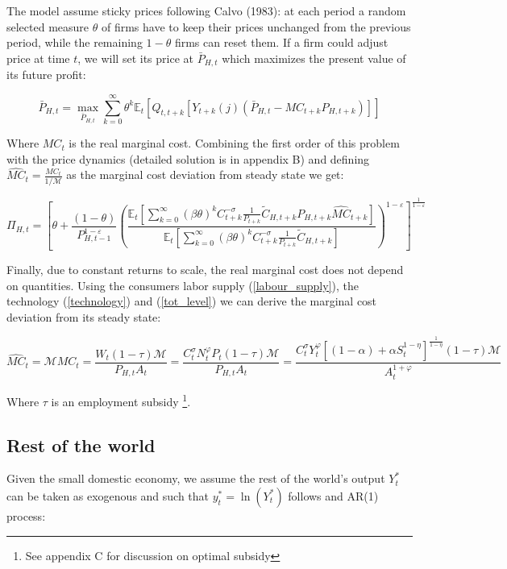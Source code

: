 \documentclass{article}
\newcommand{\Et}{\mathbb{E}_t}
\begin{document}
The model assume sticky prices following Calvo (1983): at each period a random selected measure $\theta$ of firms have to keep their prices unchanged from the previous period, while the remaining $1-\theta$ firms can reset them. If a firm could adjust price at time $t$, we will set its price at $\bar P_{H,t}$ which maximizes the present value of its future profit:

\begin{equation}
    \bar P_{H,t} = \max_{\bar P_{H,t}} \sum^\infty_{k=0} \theta^k \Et \left[ Q_{t, t+k}[Y_{t+k}(j) (\bar P_{H,t} - MC_{t+k} P_{H,t+k})] \right]
\end{equation}

Where $MC_t$ is the real marginal cost. Combining the first order of this problem with the price dynamics (detailed solution is in appendix B) and defining $\widehat{MC}_t = \frac{MC_t}{1/ \mathcal M}$ as the marginal cost deviation from steady state we get:

\begin{equation}
    \label{nkpc}
    \Pi_{H,t} = \left[ \theta + \frac{(1-\theta)}{P_{H,t-1}^{1-\varepsilon}} \left(\frac{\Et\left[ \sum^\infty_{k=0} (\beta\theta)^k C_{t+k}^{-\sigma} \frac{1}{P_{t+k}}\tilde C_{H,t+k} P_{H,t+k} \widehat{MC}_{t+k}\right] }{\Et\left[ \sum^\infty_{k=0} (\beta\theta)^k C_{t+k}^{-\sigma} \frac{1}{P_{t+k}} \tilde C_{H,t+k}  \right]} \right)^{1-\varepsilon}\right]^\frac{1}{1-\varepsilon}
\end{equation}

Finally, due to constant returns to scale, the real marginal cost does not depend on quantities. Using the consumers labor supply (\ref{labour_supply}), the technology (\ref{technology}) and (\ref{tot_level}) we can derive the marginal cost deviation from its steady state:

\begin{equation}
    \label{marginal_cost}
    \widehat{MC}_t = \mathcal M MC_t = \frac{W_t (1 - \tau) \mathcal M}{P_{H,t}A_t} = \frac{C_t^\sigma N_t^\varphi P_t (1 - \tau)\mathcal M}{P_{H,t}A_t} = \frac{C_t^\sigma Y_t^\varphi \left[(1-\alpha) + \alpha S_t^{1-\eta} \right]^{\frac{1}{1-\eta}} (1 - \tau) \mathcal M}{A_t^{1+\varphi}}
\end{equation}

Where $\tau$ is an employment subsidy \footnote{See appendix C for discussion on optimal subsidy}.\\

\subsection{Rest of the world}
Given the small domestic economy, we assume the rest of the world's output $Y_t^*$ can be taken as exogenous and such that $y_t^* = \ln(Y^*_t)$ follows and AR(1) process:
\end{document}
